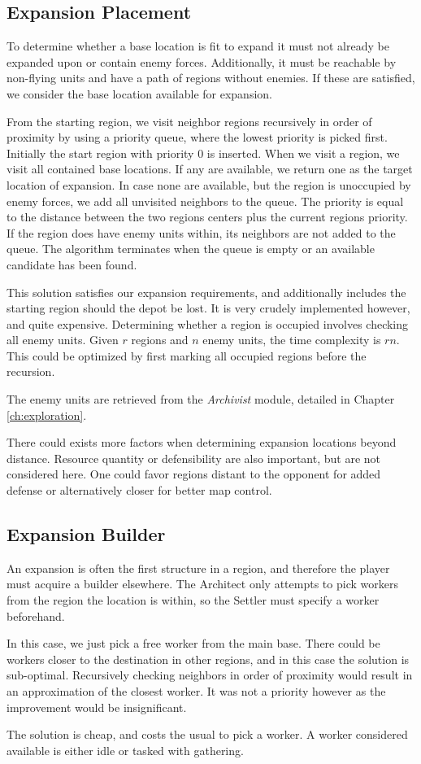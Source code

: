 	\subsection*{Expansion Placement}
	To determine whether a base location is fit to expand it must not already be expanded upon or contain enemy forces. Additionally, it must be reachable by non-flying units and have a path of regions without enemies. If these are satisfied, we consider the base location available for expansion.
	
	From the starting region, we visit neighbor regions recursively in order of proximity by using a priority queue, where the lowest priority is picked first. Initially the start region with priority 0 is inserted. When we visit a region, we visit all contained base locations. If any are available, we return one as the target location of expansion. In case none are available, but the region is unoccupied by enemy forces, we add all unvisited neighbors to the queue. The priority is equal to the distance between the two regions centers plus the current regions priority. If the region does have enemy units within, its neighbors are not added to the queue. The algorithm terminates when the queue is empty or an available candidate has been found.

	This solution satisfies our expansion requirements, and additionally includes the starting region should the depot be lost. It is very crudely implemented however, and quite expensive. Determining whether a region is occupied involves checking all enemy units. Given $r$ regions and $n$ enemy units, the time complexity is $rn$. This could be optimized by first marking all occupied regions before the recursion.
	
	The enemy units are retrieved from the \emph{Archivist} module, detailed in Chapter \ref{ch:exploration}.
	
	There could exists more factors when determining expansion locations beyond distance. Resource quantity or defensibility are also important, but are not considered here. One could favor regions distant to the opponent for added defense or alternatively closer for better map control.

	\subsection*{Expansion Builder}
	An expansion is often the first structure in a region, and therefore the player must acquire a builder elsewhere. The Architect only attempts to pick workers from the region the location is within, so the Settler must specify a worker beforehand.
	
	In this case, we just pick a free worker from the main base. There could be workers closer to the destination in other regions, and in this case the solution is sub-optimal. Recursively checking neighbors in order of proximity would result in an approximation of the closest worker. It was not a priority however as the improvement would be insignificant.
	
	The solution is cheap, and costs the usual to pick a worker. A worker considered available is either idle or tasked with gathering.